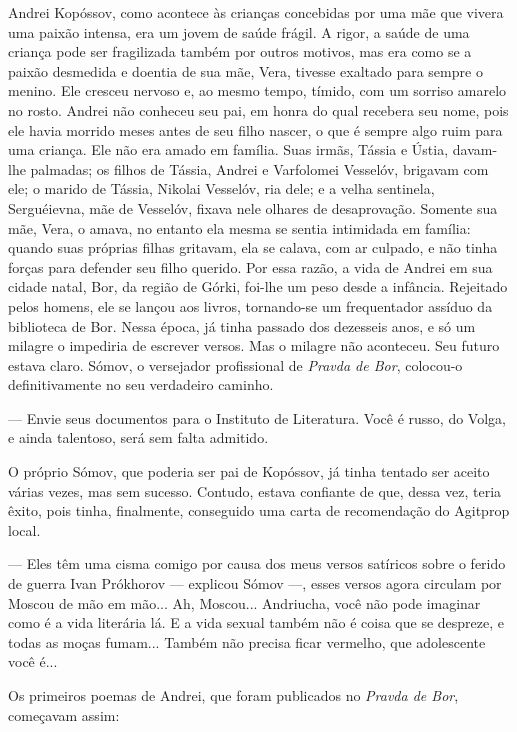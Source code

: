 Andrei Kopóssov, como acontece às crianças concebidas por uma mãe que
vivera uma paixão intensa, era um jovem de saúde frágil. A rigor, a
saúde de uma criança pode ser fragilizada também por outros motivos, mas
era como se a paixão desmedida e doentia de sua mãe, Vera, tivesse
exaltado para sempre o menino. Ele cresceu nervoso e, ao mesmo tempo,
tímido, com um sorriso amarelo no rosto. Andrei não conheceu seu pai, em
honra do qual recebera seu nome, pois ele havia morrido meses antes de
seu filho nascer, o que é sempre algo ruim para uma criança. Ele não era
amado em família. Suas irmãs, Tássia e Ústia, davam-lhe palmadas; os
filhos de Tássia, Andrei e Varfolomei Vesselóv, brigavam com ele; o
marido de Tássia, Nikolai Vesselóv, ria dele; e a velha sentinela,
Serguéievna, mãe de Vesselóv, fixava nele olhares de desaprovação.
Somente sua mãe, Vera, o amava, no entanto ela mesma se sentia
intimidada em família: quando suas próprias filhas gritavam, ela se
calava, com ar culpado, e não tinha forças para defender seu filho
querido. Por essa razão, a vida de Andrei em sua cidade natal, Bor, da
região de Górki, foi-lhe um peso desde a infância. Rejeitado pelos
homens, ele se lançou aos livros, tornando-se um frequentador assíduo da
biblioteca de Bor. Nessa época, já tinha passado dos dezesseis anos, e
só um milagre o impediria de escrever versos. Mas o milagre não
aconteceu. Seu futuro estava claro. Sómov, o versejador profissional de
\emph{Pravda de Bor}, colocou-o definitivamente no seu verdadeiro
caminho.

--- Envie seus documentos para o Instituto de Literatura. Você é russo,
do Volga, e ainda talentoso, será sem falta admitido.

O próprio Sómov, que poderia ser pai de Kopóssov, já tinha tentado ser
aceito várias vezes, mas sem sucesso. Contudo, estava confiante de que,
dessa vez, teria êxito, pois tinha, finalmente, conseguido uma carta de
recomendação do Agitprop local.

--- Eles têm uma cisma comigo por causa dos meus versos satíricos sobre
o ferido de guerra Ivan Prókhorov --- explicou Sómov ---, esses versos
agora circulam por Moscou de mão em mão... Ah, Moscou... Andriucha, você
não pode imaginar como é a vida literária lá. E a vida sexual também não
é coisa que se despreze, e todas as moças fumam... Também não precisa
ficar vermelho, que adolescente você é...

Os primeiros poemas de Andrei, que foram publicados no \emph{Pravda de
Bor}, começavam assim:

